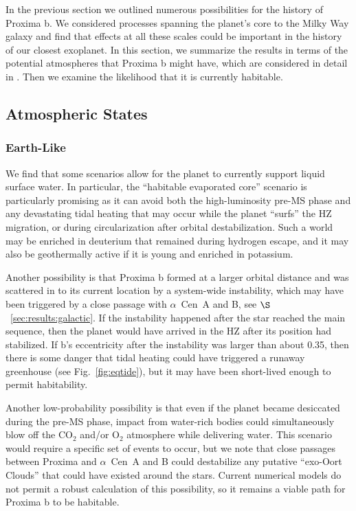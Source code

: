 \documentclass[preprint,12pt]{aastex}
\def\acen{{$\alpha$~Cen}}
\begin{document}
In the previous section we outlined numerous possibilities for the
history of Proxima b. We considered processes spanning the planet's
core to the Milky Way galaxy and find that effects at all these scales
could be important in the history of our closest exoplanet. In this
section, we summarize the results in terms of the potential
atmospheres that Proxima b might have, which are considered in
detail in \citep{Meadows16}. Then we examine the likelihood that it is
currently habitable.

\subsection{Atmospheric States}
\label{sec:results:atmstates}

\subsubsection{Earth-Like}
\label{sec:results:atmstates:earthlike}

We find that some scenarios allow for the planet to currently support liquid
surface water. In particular, the ``habitable evaporated core'' scenario
\citep{Luger15} is particularly promising as it can avoid both the
high-luminosity pre-MS phase and any devastating tidal
heating that may occur while the planet ``surfs'' the HZ migration, or
during circularization after orbital destabilization. Such a world may
be enriched in deuterium that remained during hydrogen escape, and it
may also be geothermally active if it is young and enriched in
potassium.

Another possibility is that Proxima b formed at a larger orbital
distance and was scattered in to its current location by a system-wide
instability, which may have been triggered by a close passage with
\acen~A and B, see $\S$~\ref{sec:results:galactic}. If the instability
happened after the star reached the main sequence, then the planet
would have arrived in the HZ after its position had stabilized. If b's
eccentricity after the instability was larger than about 0.35, then
there is some danger that tidal heating could have triggered a runaway
greenhouse (see Fig.~\ref{fig:eqtide}), but it may have been
short-lived enough to permit habitability.

Another low-probability possibility is that even if the planet became
desiccated during the pre-MS phase, impact from water-rich bodies
could simultaneously blow off the CO$_2$ and/or O$_2$ atmosphere while
delivering water. This scenario would require a specific set of events
to occur, but we note that close passages between Proxima and \acen~A
and B could destabilize any putative ``exo-Oort Clouds'' that could
have existed around the stars. Current numerical models do not permit
a robust calculation of this possibility, so it remains a viable path
for Proxima b to be habitable.
\end{document}
